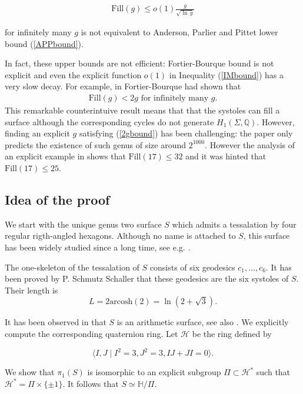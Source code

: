\documentclass[10pt,a4paper]{amsart}
\newcommand{\HP}{\mathbb{H}}
\newcommand{\Q}{\mathbb{Q}}
\newcommand{\arcosh}{\mathrm{arcosh}}
\newcommand{\Fill}{\mathrm{Fill}}
\newcommand{\cH}{\mathcal{H}}
\begin{document}
\begin{align}
\Fill(g)\leq o(1) \frac{g}{\sqrt{\ln\,g}}\label{IMbound}
\end{align}
 
 \noindent for infinitely many $g$ is not equivalent to
Anderson, Parlier and Pittet lower bound (\ref{APPbound}). 

In fact, these upper bounds are not efficient: Fortier-Bourque bound
\cite{FB20} is not explicit and even
the explicit function  $o(1)$ in Inequality (\ref{IMbound}) has a very slow decay.
For example, in \cite{FB20} Fortier-Bourque  had shown that 
\begin{align}
\Fill(g)<2g \text{ for infinitely many } g. \label{2gbound}
\end{align}
This remarkable counterintuive result means that
 that the systoles can fill a surface although
the corresponding cycles  do not generate $H_1(\Sigma, \Q)$.
However, finding an explicit $g$ satisfying (\ref{2gbound}) has been challenging: the paper
 \cite{IM} only predicts the existence of such genus of size around $2^{1000}$. However  the analysis of an explicit example in \cite{Mathieu} shows 
that $\Fill(17)\leq 32$ and it was hinted that $\Fill(17)\leq 25$.



\subsection*{ Idea of the proof}

We start with the unique genus two surface $S$ which admits a tessalation by
four regular rigth-angled hexagons.  Although no name is attached to $S$, this surface has been widely studied since a long time,
see e.g.  \cite{Broughton}\cite{SS}\cite{Harvey}\cite{KuuNaa}.

The one-skeleton of the tessalation of $S$ consists of six geodesics
$c_1,\ldots,c_6$. It has been proved by P. Schmutz Schaller \cite{SS} that 
these geodesics are the six systoles of $S$. Their length is
$$L=2\arcosh(2)=\ln(2+\sqrt{3}).$$

It has been observed in \cite{KuuNaa} that $S$ is an arithmetic surface, see
also \cite{Takeuchi}.
We explicitly compute the corresponding quaternion ring.
Let $\cH$ be the  ring  defined by

$$\langle I, J\mid I^2=3, J^2=3, IJ+JI=0\rangle.$$

\noindent We  show that $\pi_1(S)$ is
isomorphic to an explicit subgroup $\Pi\subset \cH^*$ such that
$\cH^*=\Pi\times \{\pm1\}$. It follows that
$S\simeq \HP/\Pi$.
\end{document}

